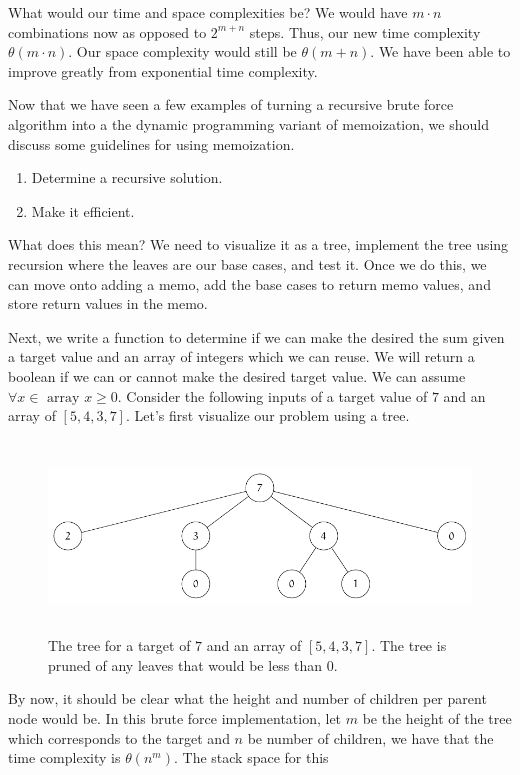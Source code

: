 \documentclass[12pt,dvipsnames,svgnames,x11names]{article}
\begin{document}
What would our time and space complexities be? We would have \(m\cdot n\) combinations now as
opposed to \(2^{m + n}\) steps. Thus, our new time complexity \(\theta (m\cdot n)\). Our space
complexity would still be \(\theta (m + n)\). We have been able to improve greatly from exponential
time complexity.
\par\medskip
Now that we have seen a few examples of turning a recursive brute force algorithm into a the 
dynamic programming variant of memoization, we should discuss some guidelines for using 
memoization.
\begin{enumerate}
	\item Determine a recursive solution.
	\item Make it efficient.
\end{enumerate}
What does this mean? We need to visualize it as a tree, implement the tree using recursion where the
leaves are our base cases, and test it. Once we do this, we can move onto adding a memo, add the
base cases to return memo values, and store return values in the memo.
\par\medskip
Next, we write a function to determine if we can make the desired the sum given a target value and
an array of integers which we can reuse. We will return a boolean if we can or cannot make the desired 
target value. We can assume \(\forall x\in\text{ array } x\geq 0\). Consider the following inputs of a target 
value of \(7\) and an array of \([5, 4, 3, 7]\). Let's first visualize our problem using a tree.
\begin{figure}[h]
	\centering
	\includegraphics[height = 2in]{can_sum.pdf}
	\caption{The tree for a target of \(7\) and an array of \([5, 4, 3, 7]\). The tree is pruned of any leaves
	that would be less than \(0\).}
	\label{fig:can_sum}
\end{figure}
By now, it should be clear what the height and number of children per parent node would be. In this
brute force implementation, let \(m\) be the height of the tree which corresponds to the target and \(n\)
be number of children, we have that the time complexity is \(\theta (n^m)\). The stack space for this 
\end{document}
